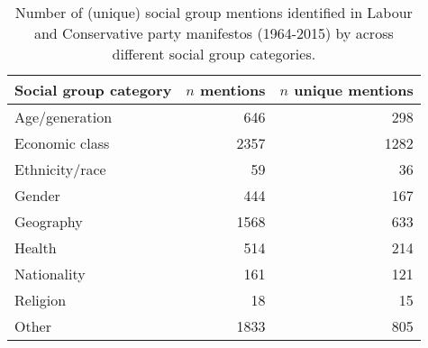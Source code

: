 \begin{table}[!h]

\caption{\label{tab:thau2019_social_group_category_counts}Number of (unique) social group mentions identified in Labour and Conservative party manifestos (1964-2015) by \citet{thau_how_2019} across different social group categories.}
\centering
\fontsize{10}{12}\selectfont
\begin{tabular}[t]{lrr}
\toprule
Social group category & $n$ mentions & $n$ unique mentions\\
\midrule
Age/generation & 646 & 298\\
Economic class & 2357 & 1282\\
Ethnicity/race & 59 & 36\\
Gender & 444 & 167\\
Geography & 1568 & 633\\
Health & 514 & 214\\
Nationality & 161 & 121\\
Religion & 18 & 15\\
Other & 1833 & 805\\
\bottomrule
\end{tabular}
\end{table}
